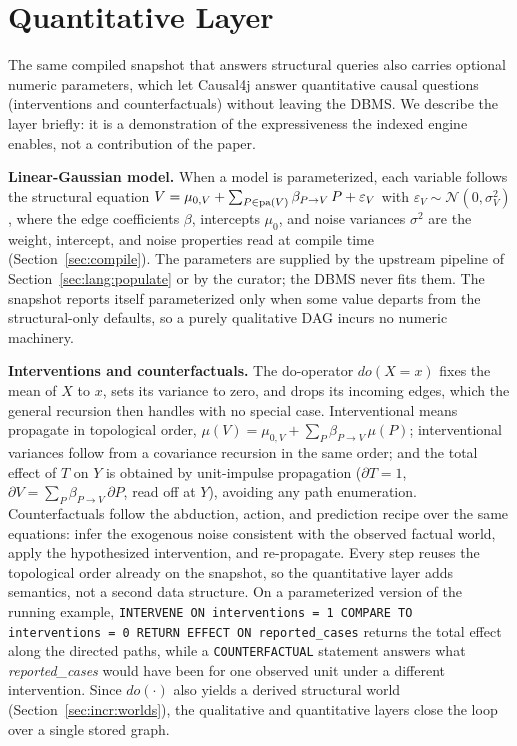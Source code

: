 \section{Quantitative Layer}\label{sec:quant}

The same compiled snapshot that answers structural queries also carries
optional numeric parameters, which let Causal4j answer quantitative causal
questions (interventions and counterfactuals) without leaving the DBMS. We
describe the layer briefly: it is a demonstration of the expressiveness the
indexed engine enables, not a contribution of the paper.

\noindent\textbf{Linear-Gaussian model.} When a model is parameterized, each
variable follows the structural equation
$V = \mu_{0,V} + \sum_{P \in \mathrm{pa}(V)} \beta_{P \rightarrow V}\,P + \varepsilon_V$
with $\varepsilon_V \sim \mathcal{N}(0, \sigma^2_V)$, where the edge
coefficients $\beta$, intercepts $\mu_0$, and noise variances $\sigma^2$ are
the \textsf{weight}, \textsf{intercept}, and \textsf{noise} properties read at
compile time (Section~\ref{sec:compile}). The parameters are supplied by the
upstream pipeline of Section~\ref{sec:lang:populate} or by the curator; the
DBMS never fits them. The snapshot reports itself parameterized only when some
value departs from the structural-only defaults, so a purely qualitative DAG
incurs no numeric machinery.

\noindent\textbf{Interventions and counterfactuals.} The do-operator
$do(X{=}x)$ fixes the mean of $X$ to $x$, sets its variance to zero, and drops
its incoming edges, which the general recursion then handles with no special
case. Interventional means propagate in topological order,
$\mu(V) = \mu_{0,V} + \sum_P \beta_{P \rightarrow V}\,\mu(P)$; interventional
variances follow from a covariance recursion in the same order; and the total
effect of $T$ on $Y$ is obtained by unit-impulse propagation
($\partial T = 1$, $\partial V = \sum_P \beta_{P \rightarrow V}\,\partial P$,
read off at $Y$), avoiding any path enumeration. Counterfactuals follow the
abduction, action, and prediction recipe over the same equations: infer the
exogenous noise consistent with the observed factual world, apply the
hypothesized intervention, and re-propagate. Every step reuses the
topological order already on the snapshot, so the quantitative layer adds
semantics, not a second data structure. On a parameterized version of the
running example,
\lstinline[style=causaldsl]|INTERVENE ON interventions = 1 COMPARE TO interventions = 0 RETURN EFFECT ON reported_cases|
returns the total effect along the directed paths, while a
\lstinline[style=causaldsl]|COUNTERFACTUAL| statement answers what
\textit{reported\_cases} would have been for one observed unit under a
different intervention. Since $do(\cdot)$ also yields a derived structural
world (Section~\ref{sec:incr:worlds}), the qualitative and quantitative
layers close the loop over a single stored graph.
